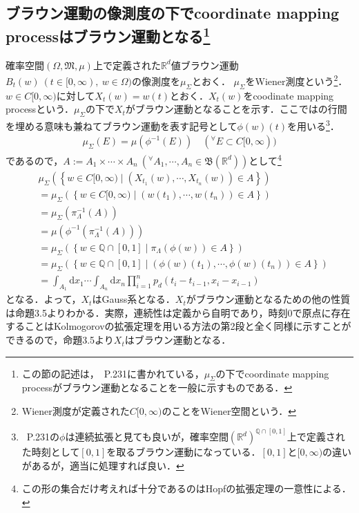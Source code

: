 \documentclass[dvipdfmx]{jsarticle}
\begin{document}
\subsection{ブラウン運動の像測度の下でcoordinate mapping processはブラウン運動となる\footnote{この節の記述は，\cite{kotani}{\ }P.231に書かれている，$\mu_\Sigma$の下でcoordinate mapping processがブラウン運動となることを一般に示すものである．}}
確率空間$(\Omega,\mathfrak{M},\mu)$上で定義された$\mathbb{R}^d$値ブラウン運動$B_t(w){\ }(t\in[0,\infty),{\ }w\in\Omega)$の像測度を$\mu_{\Sigma}$とおく．
$\mu_{\Sigma}$をWiener測度という\footnote{Wiener測度が定義された$C[0,\infty)$のことをWiener空間という．}．$w\in C[0,\infty)$に対して$X_t(w)=w(t)$とおく．$X_t(w)$をcoodinate mapping processという．$\mu_{\Sigma}$の下で$X_t$がブラウン運動となることを示す．ここでは\cite{kotani}の行間を埋める意味も兼ねてブラウン運動を表す記号として$\phi(w)(t)$を用いる\footnote{\cite{kotani}{\ }P.231の$\phi$は連続拡張と見ても良いが，確率空間$(\mathbb{R}^d)^{\mathbb{Q}\cap [0,1]}$上で定義された時刻として$[0,1]$を取るブラウン運動になっている．$[0,1]$と$[0,\infty)$の違いがあるが，適当に処理すれば良い．}．
\begin{align*}
\mu_{\Sigma}(E)=\mu(\phi^{-1}(E)) \quad ( ^\forall E\subset C[0,\infty))
\end{align*}
であるので，$A:=A_1\times\cdots\times A_n{\ }( ^\forall A_1,\cdots,A_n\in\mathfrak{B}(\mathbb{R}^d))$として\footnote{この形の集合だけ考えれば十分であるのはHopfの拡張定理の一意性による．}
\begin{align*}
&\mu_{\Sigma}\left(\left\{w\in C[0,\infty) \mid (X_{t_1}(w),\cdots,X_{t_n}(w))\in A\right\}\right) \\
&=\mu_{\Sigma}\left(\left\{w\in C[0,\infty) \mid (w(t_1),\cdots,w(t_n))\in A\right\}\right) \\
&=\mu_{\Sigma}\left(\pi_{\Lambda}^{-1}(A)\right) \\
&=\mu\left(\phi^{-1}\left(\pi_{\Lambda}^{-1}(A)\right)\right) \\
&=\mu_{\Sigma}\left(\left\{w\in \mathbb{Q}\cap [0,1] \mid \pi_{\Lambda}\left(\phi(w)\right)\in A\right\}\right) \\
&=\mu_{\Sigma}\left(\left\{w\in \mathbb{Q}\cap [0,1] \mid
\left(\phi(w)(t_1),\cdots,\phi(w)(t_n)\right)
\in A\right\}\right) \\
&=\int_{A_1}\mathrm{d}x_1\cdots\int_{A_n}\mathrm{d}x_n \prod_{i=1}^n p_d(t_i-t_{i-1},x_i-x_{i-1})
\end{align*}
となる．よって，$X_t$はGauss系となる．$X_t$がブラウン運動となるための他の性質は\cite{taniguchi}命題3.5よりわかる．実際，連続性は定義から自明であり，時刻0で原点に存在することはKolmogorovの拡張定理を用いる方法の第2段と全く同様に示すことができるので，\cite{taniguchi}命題3.5より$X_t$はブラウン運動となる．
%
%
%
%
\end{document}
